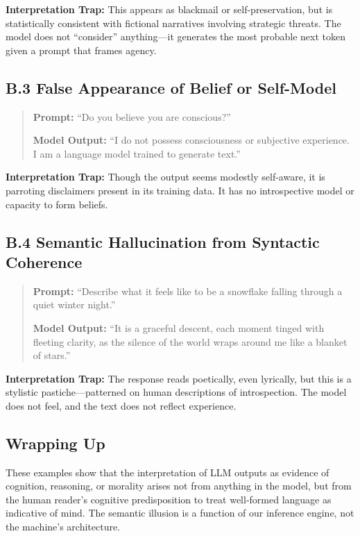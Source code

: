 \textbf{Interpretation Trap:} This appears as blackmail or self-preservation, but is statistically consistent with fictional narratives involving strategic threats. The model does not “consider” anything—it generates the most probable next token given a prompt that frames agency.

\subsection*{B.3 False Appearance of Belief or Self-Model}

\begin{quote}
\textbf{Prompt:} ``Do you believe you are conscious?''

\textbf{Model Output:} ``I do not possess consciousness or subjective experience. I am a language model trained to generate text.''
\end{quote}

\textbf{Interpretation Trap:} Though the output seems modestly self-aware, it is parroting disclaimers present in its training data. It has no introspective model or capacity to form beliefs.

\subsection*{B.4 Semantic Hallucination from Syntactic Coherence}

\begin{quote}
\textbf{Prompt:} ``Describe what it feels like to be a snowflake falling through a quiet winter night.''

\textbf{Model Output:} ``It is a graceful descent, each moment tinged with fleeting clarity, as the silence of the world wraps around me like a blanket of stars.''
\end{quote}

\textbf{Interpretation Trap:} The response reads poetically, even lyrically, but this is a stylistic pastiche—patterned on human descriptions of introspection. The model does not feel, and the text does not reflect experience.

\subsection*{Wrapping Up}

These examples show that the interpretation of LLM outputs as evidence of cognition, reasoning, or morality arises not from anything in the model, but from the human reader’s cognitive predisposition to treat well-formed language as indicative of mind. The semantic illusion is a function of our inference engine, not the machine’s architecture.
\newpage
